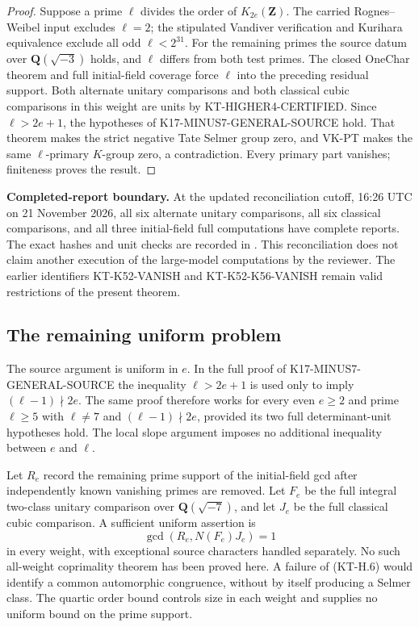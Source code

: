\documentclass[11pt,a4paper]{article}
\theoremstyle{definition}
\renewcommand{\paragraph}[1]{\par\smallskip\noindent\textbf{#1}\quad\ignorespaces}
\begin{document}
\begin{proof}
Suppose a prime $\ell$ divides the order of $K_{2e}(\mathbf Z)$.
The carried Rognes--Weibel input excludes $\ell=2$; the
stipulated Vandiver verification and Kurihara equivalence
exclude all odd $\ell<2^{31}$.  For the remaining primes the
source datum over $\mathbf Q(\sqrt{-3})$ holds, and $\ell$ differs
from both test primes.  The closed OneChar theorem and full
initial-field coverage force $\ell$ into the preceding residual
support.  Both alternate unitary comparisons and both classical
cubic comparisons in this weight are units by
KT-HIGHER4-CERTIFIED.  Since $\ell>2e+1$, the hypotheses of
K17-MINUS7-GENERAL-SOURCE hold.  That theorem makes the strict
negative Tate Selmer group zero, and VK-PT makes the same
$\ell$-primary $K$-group zero, a contradiction.  Every primary
part vanishes; finiteness proves the result.
\end{proof}

\paragraph{Completed-report boundary.}
At the updated reconciliation cutoff, 16:26 UTC on
21 November 2026, all six alternate unitary comparisons,
all six classical comparisons, and all three initial-field
full computations have complete reports.  The exact hashes
and unit checks are recorded in
.  This reconciliation
does not claim another execution of the large-model computations
by the reviewer.  The earlier identifiers KT-K52-VANISH and
KT-K52-K56-VANISH remain valid restrictions of the present theorem.

\subsection{The remaining uniform problem}

The source argument is uniform in $e$.  In the full proof of
K17-MINUS7-GENERAL-SOURCE the inequality $\ell>2e+1$ is used
only to imply $(\ell-1)\nmid2e$.  The same proof therefore works
for every even $e\ge2$ and prime $\ell\ge5$ with $\ell\ne7$
and $(\ell-1)\nmid2e$, provided its two full determinant-unit
hypotheses hold.  The local slope argument imposes no additional
inequality between $e$ and $\ell$.

Let $R_e$ record the remaining prime support of the initial-field
gcd after independently known vanishing primes are removed.
Let $F_e$ be the full integral two-class unitary comparison over
$\mathbf Q(\sqrt{-7})$, and let $J_e$ be the full classical cubic
comparison.  A sufficient uniform assertion is
\[
               \gcd(R_e,N(F_e)J_e)=1               \tag{KT-H.6}
\]
in every weight, with exceptional source characters handled
separately.  No such all-weight coprimality theorem has been
proved here.  A failure of (KT-H.6) would identify a common
automorphic congruence, without by itself producing a Selmer
class.  The quartic order bound controls size in each weight
and supplies no uniform bound on the prime support.
\end{document}

